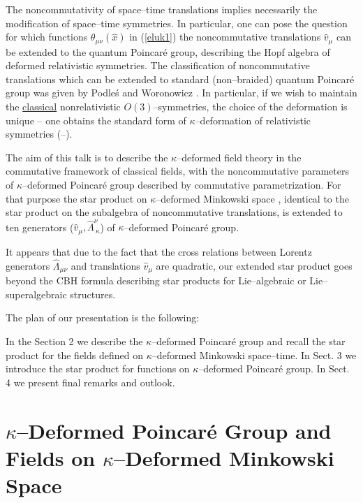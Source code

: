 \documentclass[a4paper,12pt]{article}
\begin{document}
The noncommutativity of space--time translations implies
necessarily the modification of space--time symmetries. In
particular, one can pose the question  for which functions
 $\theta_{\mu\nu}(\widehat{x})$ in (\ref{eluk1}) the
 noncommutative translations $\widehat{v}_{\mu}$ can be
 extended to the quantum Poincar\'{e} group, describing the Hopf
 algebra of deformed relativistic symmetries. The classification
 of noncommutative translations which can be extended to standard
 (non--braided) quantum Poincar\'{e} group   was given by
 Podle\'{s} and Woronowicz \cite{rluk10}. In particular, if we
 wish
 to maintain the \underline{classical} nonrelativistic
 $O(3)$--symmetries, the choice of the deformation is unique -- one
 obtains the standard form of $\kappa$--deformation of
 relativistic  symmetries (\cite{rluk11}--\cite{rluk13}).

 The aim of  this talk is to describe the $\kappa$--deformed
 field theory in the commutative framework of classical fields,
 with the noncommutative parameters of $\kappa$--deformed
 Poincar\'{e} group described  by  commutative
 parametrization. For that purpose the star  product on
 $\kappa$--deformed Minkowski space     \cite{rluk14}, identical
 to the star product on the subalgebra of noncommutative
 translations, is  extended to ten generators
 ($\widehat{v}_{\mu}, \widehat{\Lambda}_{\ \kappa}^{\nu}$) of
  $\kappa$--deformed Poincar\'{e} group.

  It  appears that  due to the fact that the cross relations  between  
Lorentz
  generators $\widehat{\Lambda}_{\mu\nu}$ and translations
  $\widehat{v}_{\mu}$ are quadratic, our  extended star product
  goes beyond the CBH formula describing star products for
  Lie--algebraic or Lie--superalgebraic structures.

  The plan of our presentation is the following:

  In the Section 2 we describe the $ \kappa$--deformed
  Poincar\'{e}  group and recall the star product for the fields
  defined on $\kappa$--deformed Minkowski space--time. In Sect. 3
  we introduce the  star product for functions on
  $\kappa$--deformed Poincar\'{e} group. In Sect. 4 we present
  final remarks and outlook.


\section{$\kappa$--Deformed Poincar\'{e} Group and Fields on
$\kappa$--Deformed Minkowski Space}
\end{document}
